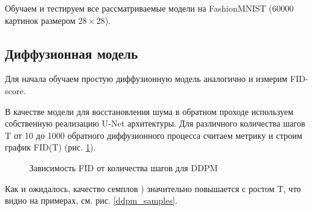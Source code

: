 \documentclass{article}
\begin{document}
 Обучаем и тестируем все рассматриваемые модели на FashionMNIST \cite{xiao2017fashionmnist} (60000 картинок размером $28\times 28$).


\subsection{Диффузионная модель}
Для начала обучаем простую диффузионную модель аналогично \cite{https://doi.org/10.48550/arxiv.2006.11239} и измерим FID-score.

В качестве модели для восстановления шума в обратном проходе используем собственную реализацию U-Net архитектуры. Для различного количества шагов T от 10 до 1000 обратного диффузионного процесса считаем метрику и строим график  FID(T) (рис. \ref{ddpm_fid}).

\begin{figure}[H]
	\caption{Зависимость FID от количества шагов для DDPM}\label{ddpm_fid}
\end{figure}

Как и ожидалось, качество семплов ) значительно повышается с ростом T, что видно на примерах, см. рис. \ref{ddpm_samples}.
\end{document}
